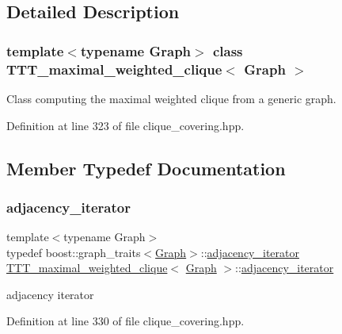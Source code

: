 \subsection{Detailed Description}
\subsubsection*{template$<$typename Graph$>$\newline
class T\+T\+T\+\_\+maximal\+\_\+weighted\+\_\+clique$<$ Graph $>$}

Class computing the maximal weighted clique from a generic graph. 

Definition at line 323 of file clique\+\_\+covering.\+hpp.



\subsection{Member Typedef Documentation}
\mbox{\label{classTTT__maximal__weighted__clique_ac24b6579a2e4fbd1d1531b782c0bff89}} 
\subsubsection{\texorpdfstring{adjacency\+\_\+iterator}{adjacency\_iterator}}
{\footnotesize\ttfamily template$<$typename Graph$>$ \\
typedef boost\+::graph\+\_\+traits$<$\hyperlink{structGraph}{Graph}$>$\+::\hyperlink{classTTT__maximal__weighted__clique_ac24b6579a2e4fbd1d1531b782c0bff89}{adjacency\+\_\+iterator} \hyperlink{classTTT__maximal__weighted__clique}{T\+T\+T\+\_\+maximal\+\_\+weighted\+\_\+clique}$<$ \hyperlink{structGraph}{Graph} $>$\+::\hyperlink{classTTT__maximal__weighted__clique_ac24b6579a2e4fbd1d1531b782c0bff89}{adjacency\+\_\+iterator}\hspace{0.3cm}{\ttfamily [private]}}



adjacency iterator 



Definition at line 330 of file clique\+\_\+covering.\+hpp.

